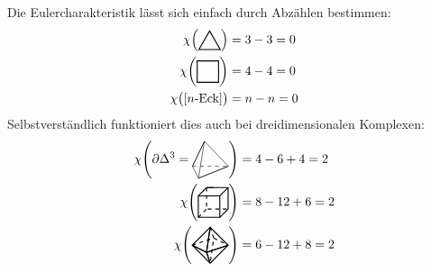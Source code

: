 Die Eulercharakteristik lässt sich einfach durch Abzählen bestimmen: 
\begin{align*}
	\chi \enbrace*{\vcenter{\hbox{\begin{tikzpicture}
		\coordinate (0) at (0,0);
		\coordinate (1) at (0.6,0);
		\coordinate (2) at (60:0.6);
		\draw[thick] (1) -- (0) -- (2) -- cycle;
	\end{tikzpicture}}} } &= 3 -3 = 0 \\
	\chi \enbrace[\bigg]{\vcenter{\hbox{\begin{tikzpicture}
		\coordinate (0) at (0,0);
		\coordinate (1) at (0.6,0);
		\coordinate (2) at (0.6,0.6);
		\coordinate (3) at (0,0.6);
		\draw[thick] (0) -- (1) -- (2) -- (3) -- cycle;
	\end{tikzpicture}}} } &= 4-4 =0 \\
	\chi \enbrace[\big]{\benbrace*{n\text{-Eck}}} &= n-n = 0
\end{align*}
Selbstverständlich funktioniert dies auch bei dreidimensionalen Komplexen:
\begin{align*}
	\chi \enbrace*{\partial \Delta^3 = \vcenter{\hbox{\begin{tikzpicture}
			\coordinate (0) at (0,0);
			\coordinate (1) at (1,0);
			\coordinate (2) at (0.5,0,0.866);
			\coordinate (3) at (0.5,0.866,0.433);
			\draw[sharp corners, dashed] (0) -- (1);
			\draw[sharp corners] (1) -- (2) -- (0) -- (3) -- (2) -- (1) -- (3) -- (0);
		\end{tikzpicture}}} } &= 4 - 6 +4 = 2 \\
	\chi\enbrace[\Bigg]{ \vcenter{\hbox{\begin{tikzpicture}
		\coordinate (0) at (0,0,-0.6);
		\coordinate (1) at (0.6,0,-0.6);
		\coordinate (2) at (0.6,0.6,-0.6);
		\coordinate (3) at (0,0.6,-0.6);
		\draw[thick, dashed] (3) -- (0) -- (1);
		\draw[thick] (1) -- (2) -- (3);
		\draw[thick, dashed] (0,0) -- (0);
		\draw[thick] (0.6,0) -- (0.6,0,-0.6);
		\draw[thick] (0.6,0.6) -- (0.6,0.6,-0.6);
		\draw[thick] (0,0.6) -- (0,0.6,-0.6) -- ++ (0.2,0);
		\draw[thick] (0,0) rectangle (0.6,0.6);
	\end{tikzpicture}}} } &= 8 -12 +6 = 2 \\
	\chi \enbrace*{ \vcenter{\hbox{\begin{tikzpicture}
		\coordinate (A1) at (0,0);
		\coordinate (A2) at (0.6,0.2);
		\coordinate (A3) at (1,0);
		\coordinate (A4) at (0.4,-0.2);
		\coordinate (B1) at (0.5,0.5);
		\coordinate (B2) at (0.5,-0.5);
		\begin{scope}[thick,dashed,]
		\draw (A1) -- (A2) -- (A3);
		\draw (B1) -- (A2) -- (B2);
		\end{scope}
		\begin{scope}[thick]
		\draw[] (A1) -- (A4) -- (B1);
		\draw[] (A1) -- (A4) -- (B2);
		\draw[] (A3) -- (A4) -- (B1);
		\draw[] (A3) -- (A4) -- (B2);
		\draw (B1) -- (A1) -- (B2) -- (A3) --cycle;
		\end{scope}
	\end{tikzpicture}}} } &= 6- 12  +8 = 2 
\end{align*}

